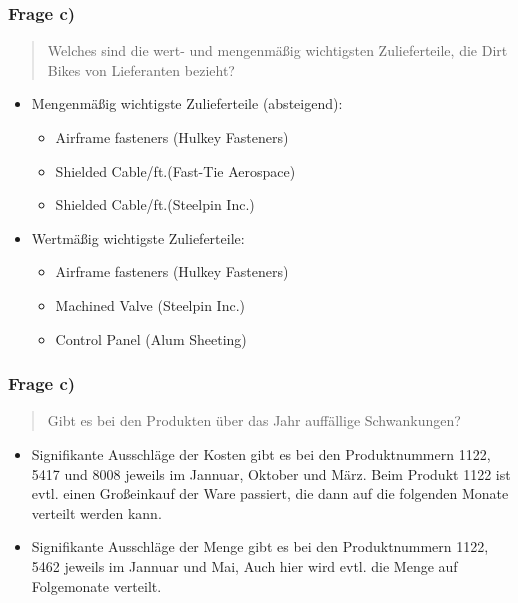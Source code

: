 \documentclass{beamer}
\begin{document}
\begin{frame}
\frametitle{Frage c)}

\begin{quote}
Welches sind die wert- und mengenm\"aßig wichtigsten Zulieferteile, die Dirt Bikes von Lieferanten bezieht?
\end{quote}

\begin{itemize}
\setlength{\itemsep}{14pt}
\item Mengenm\"aßig wichtigste Zulieferteile (absteigend):
\begin{itemize}
\item Airframe fasteners (Hulkey Fasteners)
\item Shielded Cable/ft.(Fast-Tie Aerospace)
\item Shielded Cable/ft.(Steelpin Inc.)
\end{itemize}
\item Wertm\"aßig wichtigste Zulieferteile: 
\begin{itemize}
\item Airframe fasteners (Hulkey Fasteners)
\item Machined Valve (Steelpin Inc.)
\item Control Panel (Alum Sheeting)
\end{itemize}
\end{itemize}

\end{frame}

\begin{frame}
\frametitle{Frage c)}

\begin{quote}
Gibt es bei den Produkten über das Jahr auff\"allige Schwankungen?
\end{quote}

\begin{itemize}
\setlength{\itemsep}{14pt}
\item Signifikante Ausschl\"age der Kosten gibt es bei den Produktnummern 1122, 5417 und 8008 jeweils im Jannuar, Oktober und M\"arz.
Beim Produkt 1122 ist evtl. einen Großeinkauf der Ware passiert, die dann auf die folgenden Monate verteilt werden kann.
\item Signifikante Ausschl\"age der Menge gibt es bei den Produktnummern 1122, 5462  jeweils im Jannuar und Mai,
Auch hier wird evtl. die Menge auf Folgemonate verteilt.
\end{itemize}

\end{frame}
\end{document}
